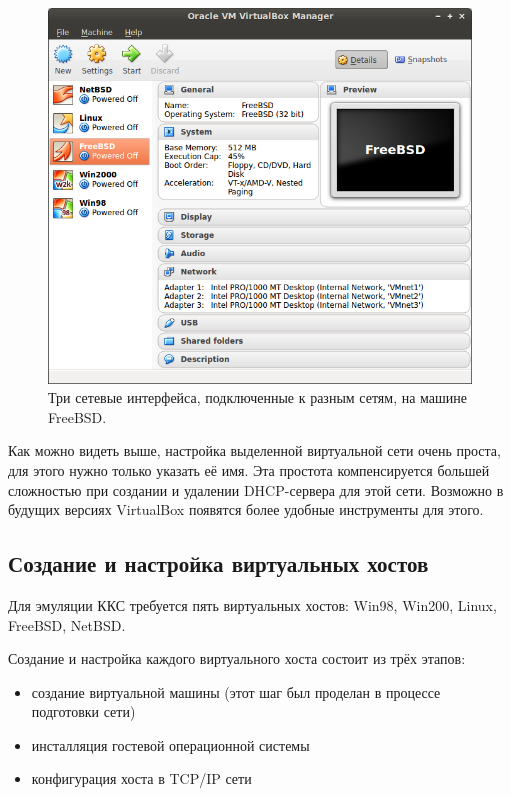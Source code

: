 \begin{figure}[h!]
\centering
\includegraphics[scale=0.6]{res/freebsd-3net}
\caption{Три сетевые интерфейса, подключенные к разным сетям, на машине FreeBSD.}
\end{figure}

Как можно видеть выше, настройка выделенной виртуальной сети очень проста, для этого нужно только указать её имя. Эта простота компенсируется большей сложностью при создании и удалении DHCP-сервера для этой сети. Возможно в будущих версиях VirtualBox появятся более удобные инструменты для этого.

\newpage
\subsection{Создание и настройка виртуальных хостов}

Для эмуляции ККС требуется пять виртуальных хостов: Win98, Win200, Linux, FreeBSD, NetBSD.

Создание и настройка каждого виртуального хоста состоит из трёх этапов:
\begin{itemize}
\item создание виртуальной машины (этот шаг был проделан в процессе подготовки сети)
\item инсталляция гостевой операционной системы
\item конфигурация хоста в TCP/IP сети
\end{itemize}

